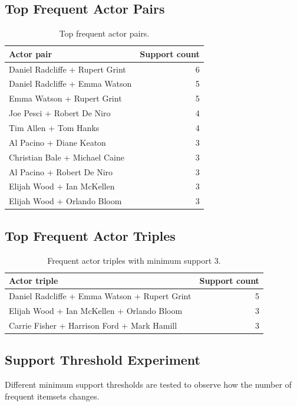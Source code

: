 \documentclass[11pt,a4paper]{article}
\begin{document}
\subsection{Top Frequent Actor Pairs}
\begin{table}[H]
\centering
\begin{tabular}{lr}
\toprule
Actor pair & Support count \\
\midrule
Daniel Radcliffe + Rupert Grint & 6 \\
Daniel Radcliffe + Emma Watson & 5 \\
Emma Watson + Rupert Grint & 5 \\
Joe Pesci + Robert De Niro & 4 \\
Tim Allen + Tom Hanks & 4 \\
Al Pacino + Diane Keaton & 3 \\
Christian Bale + Michael Caine & 3 \\
Al Pacino + Robert De Niro & 3 \\
Elijah Wood + Ian McKellen & 3 \\
Elijah Wood + Orlando Bloom & 3 \\
\bottomrule
\end{tabular}
\caption{Top frequent actor pairs.}
\end{table}

\subsection{Top Frequent Actor Triples}
\begin{table}[H]
\centering
\begin{tabular}{lr}
\toprule
Actor triple & Support count \\
\midrule
Daniel Radcliffe + Emma Watson + Rupert Grint & 5 \\
Elijah Wood + Ian McKellen + Orlando Bloom & 3 \\
Carrie Fisher + Harrison Ford + Mark Hamill & 3 \\
\bottomrule
\end{tabular}
\caption{Frequent actor triples with minimum support 3.}
\end{table}

\subsection{Support Threshold Experiment}
Different minimum support thresholds are tested to observe how the number of frequent itemsets changes.
\end{document}
